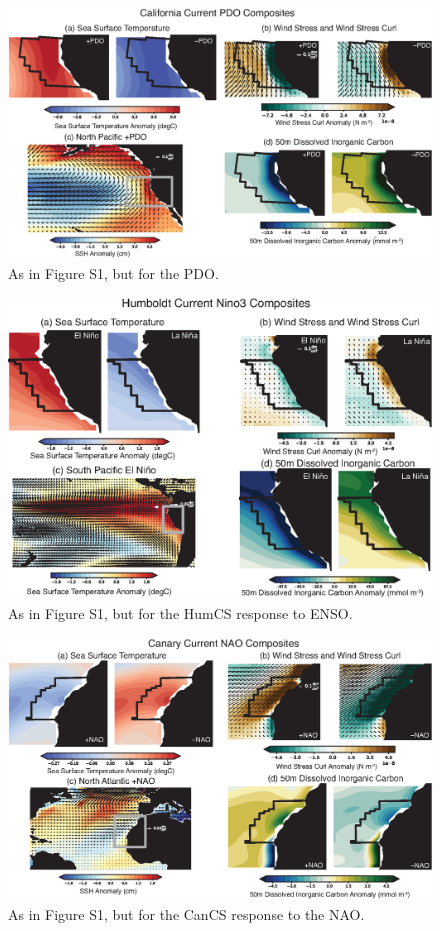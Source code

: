 \documentclass[]{article}
\begin{document}
\newpage
\begin{figure}[h]
	\centering
	\includegraphics[width=39pc]{figs/S4_CalCS_PDO_composites.eps}
	\caption{As in Figure S1, but for the PDO.}
\end{figure}

\newpage
\begin{figure}[h]
	\centering
	\includegraphics[width=39pc]{figs/S6_HumCS_nino3_composites.eps}
	\caption{As in Figure S1, but for the HumCS response to ENSO.}
\end{figure}

\newpage
\begin{figure}[h]
	\centering
	\includegraphics[width=39pc]{figs/S5_CanCS_NAO_composites.eps}
	\caption{As in Figure S1, but for the CanCS response to the NAO.}
\end{figure}
\end{document}
